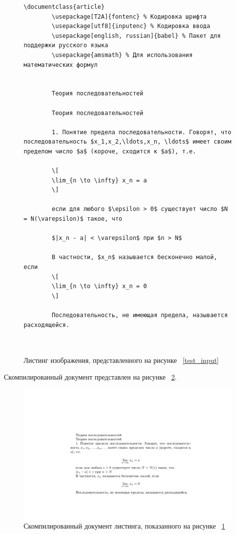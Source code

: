 \begin{figure}
    \begin{lstlisting}[language={[LaTeX]TeX}]
        \documentclass{article}
        \usepackage[T2A]{fontenc} % Кодировка шрифта
        \usepackage[utf8]{inputenc} % Кодировка ввода
        \usepackage[english, russian]{babel} % Пакет для поддержки русского языка
        \usepackage{amsmath} % Для использования математических формул
            
        
        Теория последовательностей
        
        Теория последовательностей
        
        1. Понятие предела последовательности. Говорят, что последовательность $x_1,x_2,\ldots,x_n, \ldots$ имеет своим пределом число $a$ (короче, сходится к $a$), т.е.
        
        \[
        \lim_{n \to \infty} x_n = a
        \]
        
        если для любого $\epsilon > 0$ существует число $N = N(\varepsilon)$ такое, что
        
        $|x_n - a| < \varepsilon$ при $n > N$
        
        В частности, $x_n$ называется бесконечно малой, если
        \[
        \lim_{n \to \infty} x_n = 0
        \]
        
        Последовательность, не имеющая предела, называется расходящейся.
            
        
    \end{lstlisting}
    \caption{Листинг изображения, представленного на рисунке ~\ref{test_input}}
    \label{test_listing}
\end{figure}


Скомпилированный документ представлен на рисунке ~\ref{test_compiled}.

\begin{figure}
    \includegraphics[scale=0.8]{img/app/generated_doc.jpg}
    \caption{Скомпилированный документ листинга, показанного на рисунке ~\ref{test_listing}}
    \label{test_compiled}
\end{figure}